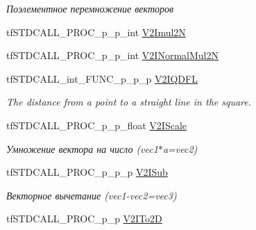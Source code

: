 \begin{DoxyCompactItemize}
\begin{DoxyCompactList}\small\item\em Поэлементное перемножение векторов \end{DoxyCompactList}\item 
tf\-S\-T\-D\-C\-A\-L\-L\-\_\-\-P\-R\-O\-C\-\_\-p\-\_\-p\-\_\-int \hyperlink{structs_functions_vector_c_p_u_afa4818ba9fd4b40a003cd1f47f351dda}{V2\-Imul2\-N}
\item 
tf\-S\-T\-D\-C\-A\-L\-L\-\_\-\-P\-R\-O\-C\-\_\-p\-\_\-p\-\_\-int \hyperlink{structs_functions_vector_c_p_u_a0918eb98630b55ea99499e206aa8d144}{V2\-I\-Normal\-Mul2\-N}
\item 
\hypertarget{structs_functions_vector_c_p_u_afcd617ee1ddeda832b458cd224f2ea7b}{tf\-S\-T\-D\-C\-A\-L\-L\-\_\-int\-\_\-\-F\-U\-N\-C\-\_\-p\-\_\-p\-\_\-p \hyperlink{structs_functions_vector_c_p_u_afcd617ee1ddeda832b458cd224f2ea7b}{V2\-I\-Q\-D\-F\-L}}\label{structs_functions_vector_c_p_u_afcd617ee1ddeda832b458cd224f2ea7b}

\begin{DoxyCompactList}\small\item\em The distance from a point to a straight line in the square. \end{DoxyCompactList}\item 
\hypertarget{structs_functions_vector_c_p_u_a1fd2352da3eb69e19ffb08e79ca21222}{tf\-S\-T\-D\-C\-A\-L\-L\-\_\-\-P\-R\-O\-C\-\_\-p\-\_\-p\-\_\-float \hyperlink{structs_functions_vector_c_p_u_a1fd2352da3eb69e19ffb08e79ca21222}{V2\-I\-Scale}}\label{structs_functions_vector_c_p_u_a1fd2352da3eb69e19ffb08e79ca21222}

\begin{DoxyCompactList}\small\item\em Умножение вектора на число (vec1$\ast$a=vec2) \end{DoxyCompactList}\item 
\hypertarget{structs_functions_vector_c_p_u_a15e86bec8c5f0588f06dfe633aca877b}{tf\-S\-T\-D\-C\-A\-L\-L\-\_\-\-P\-R\-O\-C\-\_\-p\-\_\-p\-\_\-p \hyperlink{structs_functions_vector_c_p_u_a15e86bec8c5f0588f06dfe633aca877b}{V2\-I\-Sub}}\label{structs_functions_vector_c_p_u_a15e86bec8c5f0588f06dfe633aca877b}

\begin{DoxyCompactList}\small\item\em Векторное вычетание (vec1-\/vec2=vec3) \end{DoxyCompactList}\item 
\hypertarget{structs_functions_vector_c_p_u_afc92ce931dae98b420a3b2a00e349e4d}{tf\-S\-T\-D\-C\-A\-L\-L\-\_\-\-P\-R\-O\-C\-\_\-p\-\_\-p \hyperlink{structs_functions_vector_c_p_u_afc92ce931dae98b420a3b2a00e349e4d}{V2\-I\-To2\-D}}\label{structs_functions_vector_c_p_u_afc92ce931dae98b420a3b2a00e349e4d}


\end{DoxyCompactItemize}
